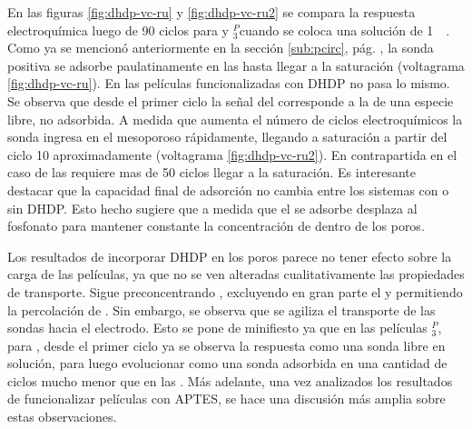 		    En las figuras \ref{fig:dhdp-vc-ru} y \ref{fig:dhdp-vc-ru2} se compara la respuesta electroquímica luego de 90 ciclos para \pdmZ\space y \pdmZ$^P_3$\space cuando se coloca una solución de \ru\space \SI{1}{\milli\Molar}. Como ya se mencionó anteriormente en la sección \ref{sub:pcirc}, pág. \pageref{sub:pcirc}, la sonda positiva se adsorbe paulatinamente en las \pdmZ\space hasta llegar a la saturación (voltagrama \ref{fig:dhdp-vc-ru}). En las películas funcionalizadas con DHDP no pasa lo mismo. Se observa que desde el primer ciclo la señal del \ru\space corresponde a la de una especie libre, no adsorbida. A medida que aumenta el número de ciclos electroquímicos la sonda ingresa en el mesoporoso rápidamente, llegando a saturación a partir del ciclo 10 aproximadamente (voltagrama \ref{fig:dhdp-vc-ru2}). En contrapartida en el caso de las \pdmZ\space requiere mas de 50 ciclos llegar a la saturación. Es interesante destacar que la capacidad final de adsorción no cambia entre los sistemas con o sin DHDP. Esto hecho sugiere que a medida que el \ru\space se adsorbe desplaza al fosfonato para mantener constante la concentración de \ru\space dentro de los poros.

		    Los resultados de incorporar DHDP en los poros parece no tener efecto sobre la carga de las películas, ya que no se ven alteradas cualitativamente las propiedades de transporte. Sigue preconcentrando \ru, excluyendo en gran parte el \fe\space y permitiendo la percolación de \fc. Sin embargo, se observa que se agiliza el transporte de las sondas hacia el electrodo. Esto se pone de minifiesto ya que en las películas \pdmZ$^P_3$, para \ru,  desde el primer ciclo ya se observa la respuesta como una sonda libre en solución, para luego evolucionar como una sonda adsorbida en una cantidad de ciclos mucho menor que en las \pdmZ. Más adelante, una vez analizados los resultados de funcionalizar películas con APTES, se hace una discusión más amplia sobre estas observaciones. \vspace*{-2mm}
				
